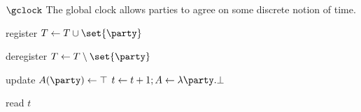 \begin{functionality}{$\gclock$}
    The global clock allows parties to agree on some discrete notion of time.
    \begin{statedecl}
    \end{statedecl}
    \begin{receive}{register}{}
        \State \Let $T \gets T \cup \set{\party}$
    \end{receive}
    \begin{receive}{deregister}{}
        \State \Let $T \gets T \setminus \set{\party}$
    \end{receive}
    \begin{receive}{update}{}
        \State \Let $A(\party) \gets \top$
          \State \Let $t \gets t + 1; A \gets \lambda \party . \bot$
          \State {}
        \EndIf
    \end{receive}
    \begin{receive}{read}{}
        \State \Return $t$
    \end{receive}
\end{functionality}

